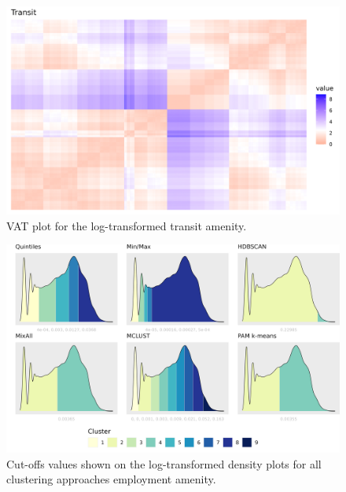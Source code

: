 \documentclass[11pt, a4paper]{article}
\begin{document}
\begin{figure}[H]
\centering
\includegraphics[width=\textwidth]{./vat/transit_vat_log.png}
\caption[Transit VAT plot]{VAT plot for the log-transformed transit amenity.}\label{transitvat}
\end{figure}









\begin{figure}[H]
\centering
\includegraphics[width=\textwidth]{./cutoffs/by_amenity/Employment_cutoffs.png}
\caption[Employment cutoffs]{Cut-offs values shown on the log-transformed density plots for all clustering approaches employment amenity.}\label{employmentcutoffs}
\end{figure}
\end{document}
